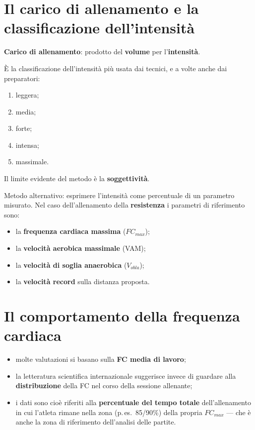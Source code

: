 \section{Il carico di allenamento e la classificazione dell'intensità}

\textbf{Carico di allenamento}: prodotto del \textbf{volume} per l'\textbf{intensità}.

È la classificazione dell'intensità più usata dai tecnici, e a volte anche dai preparatori:
\begin{enumerate}
  \item leggera;
  \item media;
  \item forte;
  \item intensa;
  \item massimale.
\end{enumerate}
Il limite evidente del metodo è la \textbf{soggettività}.

Metodo alternativo: esprimere l'intensità come percentuale di un parametro misurato. Nel caso
dell'allenamento della \textbf{resistenza} i parametri di riferimento sono:
\begin{itemize}
  \item la \textbf{frequenza cardiaca massima} ($FC_{max}$);
  \item la \textbf{velocità aerobica massimale} (VAM);
  \item la \textbf{velocità di soglia anaerobica} ($V_{obla}$);
  \item la \textbf{velocità record} sulla distanza proposta.
\end{itemize}

\section{Il comportamento della frequenza cardiaca}

\begin{itemize}
  \item molte valutazioni si basano sulla \textbf{FC media di lavoro};
  \item la letteratura scientifica internazionale suggerisce invece di guardare alla
    \textbf{distribuzione} della FC nel corso della sessione allenante;
  \item i dati sono cioè riferiti alla \textbf{percentuale del tempo totale} dell'allenamento in cui
    l'atleta rimane nella zona (p.\,es.\ 85/90\%) della propria $FC_{max}$ --- che è anche la zona di
    riferimento dell'analisi delle partite.
\end{itemize}

